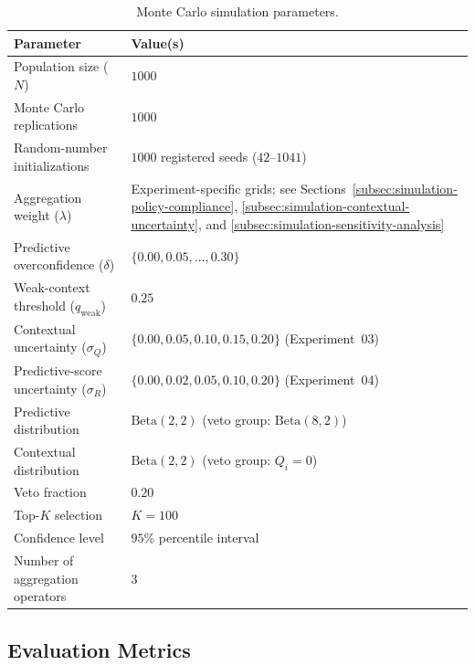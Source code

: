 \documentclass[mathematics,article,submit,moreauthors]{Definitions/mdpi}
\begin{document}
\begin{table}[H]
    \caption{Monte Carlo simulation parameters.}
    \label{tab:simulation-parameters}
    \centering
    \renewcommand{\arraystretch}{1.4}
    \begin{tabular}{ll}
    \toprule
    Parameter & Value(s) \\
    \midrule
    Population size ($N$) & $1000$ \\
    Monte Carlo replications & $1000$ \\
    Random-number initializations & $1000$ registered seeds ($42$--$1041$) \\
    Aggregation weight ($\lambda$) & {\color{blue}Experiment-specific grids; see Sections~\ref{subsec:simulation-policy-compliance}, \ref{subsec:simulation-contextual-uncertainty}, and \ref{subsec:simulation-sensitivity-analysis}} \\
    Predictive overconfidence ($\delta$) & $\{0.00,0.05,\ldots,0.30\}$ \\
    Weak-context threshold ($q_{\mathrm{weak}}$) & $0.25$ \\
    Contextual uncertainty ($\sigma_Q$) & {\color{blue}$\{0.00,0.05,0.10,0.15,0.20\}$ (Experiment~03)} \\
    Predictive-score uncertainty ($\sigma_R$) & {\color{blue}$\{0.00,0.02,0.05,0.10,0.20\}$ (Experiment~04)} \\
    Predictive distribution & $\mathrm{Beta}(2,2)$ (veto group: $\mathrm{Beta}(8,2)$) \\
    Contextual distribution & $\mathrm{Beta}(2,2)$ (veto group: $Q_i=0$) \\
    Veto fraction & $0.20$ \\
    Top-$K$ selection & $K=100$ \\
    Confidence level & $95\%$ percentile interval \\
    Number of aggregation operators & $3$ \\
    \bottomrule
    \end{tabular}
\end{table}








\subsection{Evaluation Metrics}
\label{subsec:evaluation-metrics}
\end{document}
